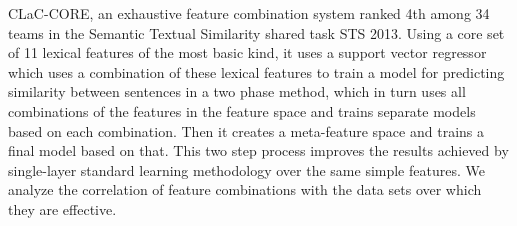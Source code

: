 CLaC-CORE, an exhaustive feature combination system ranked 4th among 34 teams in the Semantic Textual Similarity shared task STS 2013. Using a core set of 11
 lexical features of the most basic kind, it uses a support vector regressor
 which uses a combination of these lexical features to train a model for
 predicting similarity between sentences in a two phase method, which in turn
 uses all combinations of the features in the feature space and trains separate
 models based on each combination. Then it creates a meta-feature space and
 trains a final model based on that. This two step process improves the results
 achieved by single-layer standard learning methodology over the same simple
 features. We analyze the correlation of feature combinations with the data sets
 over which they are effective.

